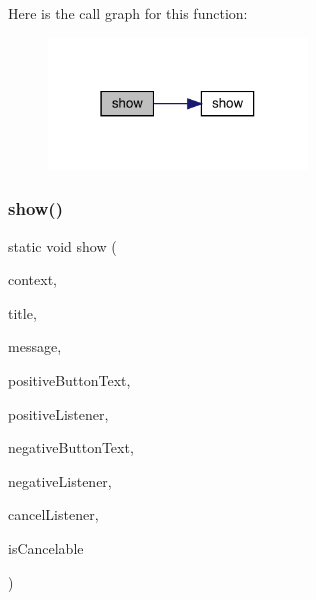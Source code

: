 Here is the call graph for this function\+:
\nopagebreak
\begin{figure}[H]
\begin{center}
\leavevmode
\includegraphics[width=195pt]{classcom_1_1toast_1_1android_1_1gamebase_1_1base_1_1ui_1_1_simple_alert_dialog_a497ac9cb638d7a7b3dc33cae5f7ff39c_cgraph}
\end{center}
\end{figure}
\mbox{\label{classcom_1_1toast_1_1android_1_1gamebase_1_1base_1_1ui_1_1_simple_alert_dialog_a71cfaa3637e0e2e692d6defa95aa2b56}} 
\subsubsection{\texorpdfstring{show()}{show()}\hspace{0.1cm}{\footnotesize\ttfamily [6/6]}}
{\footnotesize\ttfamily static void show (\begin{DoxyParamCaption}\item[{@Non\+Null final Context}]{context,  }\item[{@Non\+Null final String}]{title,  }\item[{@Non\+Null final String}]{message,  }\item[{@Nullable final String}]{positive\+Button\+Text,  }\item[{@Nullable final Dialog\+Interface.\+On\+Click\+Listener}]{positive\+Listener,  }\item[{@Nullable final String}]{negative\+Button\+Text,  }\item[{@Nullable final Dialog\+Interface.\+On\+Click\+Listener}]{negative\+Listener,  }\item[{@Nullable final Dialog\+Interface.\+On\+Cancel\+Listener}]{cancel\+Listener,  }\item[{final boolean}]{is\+Cancelable }\end{DoxyParamCaption})\hspace{0.3cm}{\ttfamily [static]}}




